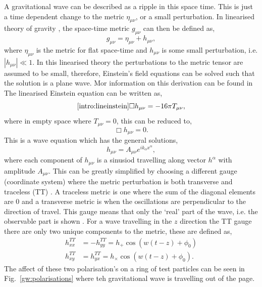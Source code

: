A gravitational wave can be described as a ripple in this space time.
This is just a time dependent change to the metric $\eta_{\mu\nu}$, or a small perturbation.
In linearised theory of gravity \cite{}, the space-time metric $g_{\mu \nu}$ can then be defined as,
\begin{equation}
    g_{\mu \nu} = \eta_{\mu \nu} + h_{\mu \nu},
\end{equation}
where $ \eta_{\mu \nu}$ is the metric for flat space-time and $h_{\mu \nu}$ is some small perturbation, i.e. $|h_{\mu \nu}| \ll 1$. 
In this linearised theory the perturbations to the metric tensor are assumed to be small, therefore, Einstein's field equations can be solved such that the solution is a plane wave. 
Mor information on this derivation can be found in \cite{Flanagan2005TheTheory,}
The linearised Einstein equation can be written as,
\begin{equation}
\ref{intro:lineinstein}
    \Box h_{\mu \nu} = -16 \pi T_{\mu\nu},
\end{equation}
where in empty space where $T_{\mu \nu} = 0$, this can be reduced to, 
\begin{equation}
    \Box h_{\mu \nu} = 0.
\end{equation}
This is a wave equation which has the general solutions,
\begin{equation}
    h_{\mu\nu} = A_{\mu\nu}e^{ik_{\alpha} x^{\alpha}},
\end{equation}
where each component of $h_{\mu \nu}$ is a sinusiod travelling along vector $h^{\alpha}$ with amplitude $A_{\mu\nu}$.
This can be greatly simplified by choosing a different gauge (coordinate system) where the metric perturbation is both transverse and traceless (TT) \cite{}.
A traceless metric is one where the sum of the diagonal elements are 0 and a transverse metric is when the oscillations are perpendicular to the direction of travel. 
This gauge means that only the `real' part of the wave, i.e. the observable part is shown .
For a wave travelling in the $z$ direction the TT gauge there are only two unique components to the metric, these are defined as,
\begin{equation}
    \begin{split}
        h_{xx}^{TT} &= -h_{yy}^{TT} = h_{+} \cos{\left( w (t - z) + \phi_0\right)} \\
        h_{xy}^{TT} &= h_{yx}^{TT} = h_{\times} \cos{\left( w (t - z) + \phi_0\right)}.
    \end{split}
\end{equation}
The affect of these two polarisation's on a ring of test particles can be seen in Fig.~\ref{gw:polarisations} where teh gravitational wave is travelling out of the page.

